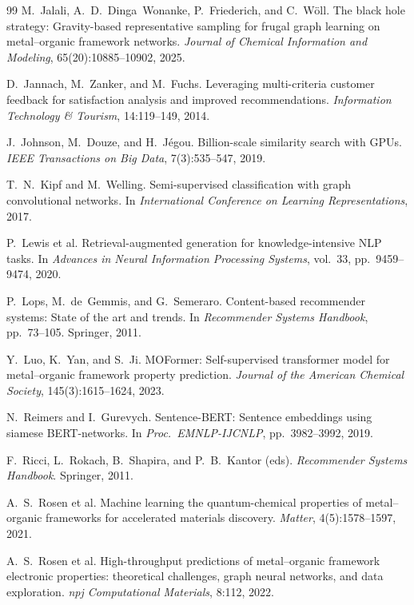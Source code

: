 \documentclass[12pt,a4paper]{article}
\begin{document}
\begin{thebibliography}{99}
 M.~Jalali, A.~D.~Dinga~Wonanke, P.~Friederich, and C.~W\"{o}ll. The black hole strategy: Gravity-based representative sampling for frugal graph learning on metal--organic framework networks. \textit{Journal of Chemical Information and Modeling}, 65(20):10885--10902, 2025.

 D.~Jannach, M.~Zanker, and M.~Fuchs. Leveraging multi-criteria customer feedback for satisfaction analysis and improved recommendations. \textit{Information Technology \& Tourism}, 14:119--149, 2014.

 J.~Johnson, M.~Douze, and H.~J\'{e}gou. Billion-scale similarity search with GPUs. \textit{IEEE Transactions on Big Data}, 7(3):535--547, 2019.

 T.~N.~Kipf and M.~Welling. Semi-supervised classification with graph convolutional networks. In \textit{International Conference on Learning Representations}, 2017.

 P.~Lewis et al. Retrieval-augmented generation for knowledge-intensive NLP tasks. In \textit{Advances in Neural Information Processing Systems}, vol.\ 33, pp.\ 9459--9474, 2020.

 P.~Lops, M.~de~Gemmis, and G.~Semeraro. Content-based recommender systems: State of the art and trends. In \textit{Recommender Systems Handbook}, pp.\ 73--105. Springer, 2011.

 Y.~Luo, K.~Yan, and S.~Ji. MOFormer: Self-supervised transformer model for metal--organic framework property prediction. \textit{Journal of the American Chemical Society}, 145(3):1615--1624, 2023.

 N.~Reimers and I.~Gurevych. Sentence-BERT: Sentence embeddings using siamese BERT-networks. In \textit{Proc.\ EMNLP-IJCNLP}, pp.\ 3982--3992, 2019.

 F.~Ricci, L.~Rokach, B.~Shapira, and P.~B.~Kantor (eds). \textit{Recommender Systems Handbook}. Springer, 2011.

 A.~S.~Rosen et al. Machine learning the quantum-chemical properties of metal--organic frameworks for accelerated materials discovery. \textit{Matter}, 4(5):1578--1597, 2021.

 A.~S.~Rosen et al. High-throughput predictions of metal--organic framework electronic properties: theoretical challenges, graph neural networks, and data exploration. \textit{npj Computational Materials}, 8:112, 2022.


\end{thebibliography}
\end{document}
